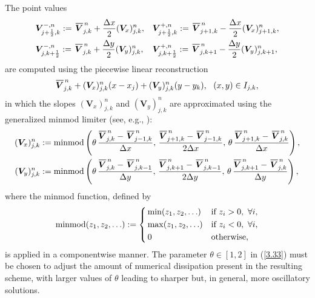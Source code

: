 \documentclass[A4paper,12pt,twoside]{article}
\numberwithin{equation}{section}
\numberwithin{figure}{section}
\numberwithin{table}{section}
\newcommand{\dx}{\Delta x}
\newcommand{\dy}{\Delta y}
\newcommand{\kph}{{k+\frac{1}{2}}}
\newcommand{\jph}{{j+\frac{1}{2}}}
\newcommand{\bV}{\bm{V}}
\newcommand\eref[1]{(\ref{#1})}
\newcommand*\xbar[1]{%
  \hbox{%
    \vbox{%
      \hrule height 0.5pt %
      \kern0.4ex%
      \hbox{%
        \kern-0.05em%
        \ensuremath{#1}%
        \kern-0.00em%
      }%
    }%
  }%
}
\newcommand{\lore}[1]{{\leavevmode\color{red} #1}}
\begin{document}
The point values
\begin{equation}
\begin{aligned}
&\bm V^{-,n}_{\jph,k}:=\,\xbar{\bm V}_{j,k}^{\,n}+\frac{\dx}{2}(\bm V_x)_{j,k}^n,&&
\bm V^{+,n}_{\jph,k}:=\,\xbar{\bm V}_{j+1,k}^{\,n}-\frac{\dx}{2}(\bm V_x)_{j+1,k}^n,\\
&\bm V^{-,n}_{j,\kph}:=\,\xbar{\bm V}_{j,k}^{\,n}+\frac{\dy}{2}(\bm V_y)_{j,k}^n,&&
\bm V^{+,n}_{j,\kph}:=\,\xbar{\bm V}_{j,k+1}^{\,n}-\frac{\dy}{2}(\bm V_y)_{j,k+1}^n,
\end{aligned}
\label{3.33f}
\end{equation}
are computed using the piecewise linear reconstruction
$$
\xbar{\bm V}_{j,k}^{\,n}+(\bm V_x)_{j,k}^n(x-x_j)+(\bm V_y)_{j,k}^n(y-y_k),~~(x,y)\in I_{j,k},
$$
in which the slopes $(\bm V_x)_{j,k}^n$ and $(\bm V_y)_{j,k}^n$ are approximated using the generalized minmod limiter (see, e.g.,
\cite{LieNoe,nessyahu1990non,sweby1984high}):
\begin{equation}
\begin{aligned}
(\bV_x)_{j,k}^n&:={\rm minmod}\left(\theta\,\frac{\xbar{\bV}_{j,k}^{\,n}-\,\xbar{\bV}_{j-1,k}^{\,n}}{\dx},\,
\frac{\xbar{\bV}_{j+1,k}^{\,n}-\,\xbar{\bV}_{j-1,k}^{\,n}}{2\dx},\,
\theta\,\frac{\xbar{\bV}_{j+1,k}^{\,n}-\,\xbar{\bV}_{j,k}^{\,n}}{\dx}\right),\\
(\bV_y)_{j,k}^n&:={\rm minmod}\left(\theta\,\frac{\xbar{\bV}_{j,k}^{\,n}-\,\xbar{\bV}_{j,k-1}^{\,n}}{\dy},\,
\frac{\xbar{\bV}_{j,k+1}^{\,n}-\,\xbar{\bV}_{j,k-1}^{\,n}}{2\dy},\,
\theta\,\frac{\xbar{\bV}_{j,k+1}^{\,n}-\,\xbar{\bV}_{j,k}^{\,n}}{\dy}\right),
\end{aligned}
\label{3.33}
\end{equation}
where the minmod function, defined by
\begin{equation*}
{\rm minmod}(z_1,z_2,\ldots):=\left\{\begin{aligned}
&\min(z_1,z_2,\ldots)&&\mbox{if}~z_i>0,~\forall i,\\
&\max(z_1,z_2,\ldots)&&\mbox{if}~z_i<0,~\forall i,\\
&\,0&&\mbox{otherwise},
\end{aligned}\right.
\end{equation*}
is applied in a componentwise manner. The parameter $\theta\in[1,2]$ in \eref{3.33} \lore{must} %
be chosen to adjust the amount of numerical
dissipation present in the resulting scheme, with larger values of $\theta$ leading to sharper but, in general, more oscillatory solutions.
\end{document}
